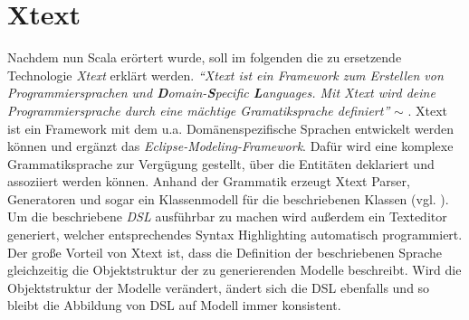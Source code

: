 \section{Xtext}\label{xtext}
Nachdem nun Scala erörtert wurde, soll im folgenden die zu ersetzende Technologie \textit{Xtext} erklärt werden.
\textit{"`Xtext ist ein Framework zum Erstellen von Programmiersprachen und \textbf{D}omain-\textbf{S}pecific \textbf{L}anguages. Mit Xtext wird deine Programmiersprache durch eine mächtige Gramatiksprache definiert"'} $\sim$ \citet{xtext:website}.
Xtext ist ein Framework mit dem u.a. Domänenspezifische Sprachen entwickelt werden können und ergänzt das \textit{Eclipse-Modeling-Framework}\cite{emf}. Dafür wird eine komplexe Grammatiksprache zur Vergügung gestellt, über die Entitäten deklariert und assoziiert werden können. Anhand der Grammatik erzeugt Xtext Parser, Generatoren und sogar ein Klassenmodell für die beschriebenen Klassen (vgl. \citet{xtext:goodbyexml}). Um die beschriebene \textit{DSL} ausführbar zu machen wird außerdem ein Texteditor generiert, welcher entsprechendes Syntax Highlighting automatisch programmiert. Der große Vorteil von Xtext ist, dass die Definition der beschriebenen Sprache gleichzeitig die Objektstruktur der zu generierenden Modelle beschreibt. Wird die Objektstruktur der Modelle verändert, ändert sich die DSL ebenfalls und so bleibt die Abbildung von DSL auf Modell immer konsistent. 

